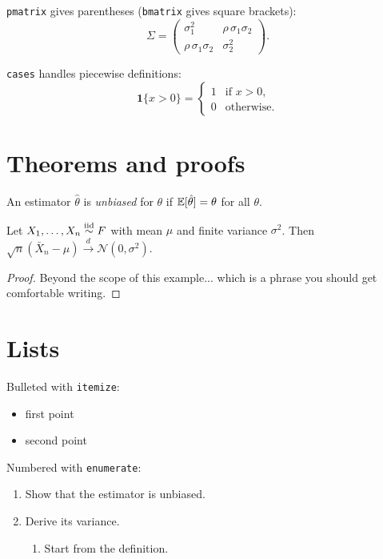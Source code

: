 \texttt{pmatrix} gives parentheses (\texttt{bmatrix} gives square brackets):
\[
  \Sigma = \begin{pmatrix}
             \sigma_1^2            & \rho\,\sigma_1\sigma_2 \\
             \rho\,\sigma_1\sigma_2 & \sigma_2^2
           \end{pmatrix}.
\]

\texttt{cases} handles piecewise definitions:
\[
  \mathbf{1}\{x > 0\} =
  \begin{cases}
    1 & \text{if } x > 0, \\
    0 & \text{otherwise.}
  \end{cases}
\]

\section{Theorems and proofs}

\begin{definition}
  An estimator $\hat{\theta}$ is \emph{unbiased} for $\theta$ if
  $\mathbb{E}[\hat{\theta}] = \theta$ for all $\theta$.
\end{definition}

\begin{theorem}
  Let $X_1, \ldots, X_n \overset{\text{iid}}{\sim} F$ with mean $\mu$ and finite variance $\sigma^2$.
  Then $\sqrt{n}(\bar{X}_n - \mu) \xrightarrow{d} \mathcal{N}(0, \sigma^2)$.
\end{theorem}

\begin{proof}
  Beyond the scope of this example... which is a phrase you should get comfortable
  writing.
\end{proof}

\section{Lists}

Bulleted with \texttt{itemize}:
\begin{itemize}
  \item first point
  \item second point
\end{itemize}

Numbered with \texttt{enumerate}:
\begin{enumerate}
  \item Show that the estimator is unbiased.
  \item Derive its variance.
    \begin{enumerate}
      \item Start from the definition.
    \end{enumerate}
\end{enumerate}


